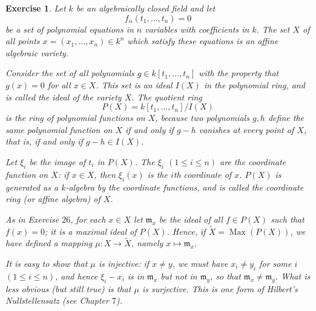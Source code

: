 \documentclass[12pt,letterpaper]{article}
\newtheorem{problem}{Exercise}[section]
\theoremstyle{definition}
\theoremstyle{remark}
\numberwithin{figure}{problem}
\numberwithin{equation}{section}
\DeclareMathOperator{\Max}{Max}
\begin{document}
\begin{problem}
  Let $k$ be an algebraically closed field and let
  \begin{equation*}
    f_\alpha(t_1,\ldots,t_n) = 0
  \end{equation*}
  be a set of polynomial equations in $n$ variables with coefficients in $k$. The set $X$ of all points $x = (x_1,\ldots,x_n) \in k^n$ which satisfy these equations is an \emph{affine algebraic variety}.
  \par Consider the set of all polynomials $g \in k[t_1,\ldots,t_n]$ with the property that $g(x) = 0$ for all $x \in X$. This set is an ideal $I(X)$ in the polynomial ring, and is called the \emph{ideal of the variety $X$}. The quotient ring
  \begin{equation*}
    P(X) = k[t_1,\ldots,t_n]/I(X)
  \end{equation*}
  is the ring of polynomial functions on $X$, because two polynomials $g,h$ define the same polynomial function on $X$ if and only if $g - h$ vanishes at every point of $X$, that is, if and only if $g - h \in I(X)$.
  \par Let $\xi_i$ be the image of $t_i$ in $P(X)$. The $\xi_i$ $(1 \le i \le n)$ are the \emph{coordinate function} on $X$: if $x \in X$, then $\xi_i(x)$ is the $i$th coordinate of $x$. $P(X)$ is generated as a $k$-algebra by the coordinate functions, and is called the \emph{coordinate ring} (or affine algebra) of $X$.
  \par As in Exercise \hyperref[exc:1.26]{$26$}, for each $x \in X$ let $\mathfrak{m}_x$ be the ideal of all $f \in P(X)$ such that $f(x) = 0$; it is a maximal ideal of $P(X)$. Hence, if $\tilde{X} = \Max(P(X))$, we have defined a mapping $\mu \colon X \to \tilde{X}$, namely $x \mapsto \mathfrak{m}_x$.
  \par It is easy to show that $\mu$ is injective: if $x \ne y$, we must have $x_i \ne y_i$ for some $i$ $(1 \le i \le n)$, and hence $\xi_i - x_i$ is in $\mathfrak{m}_x$ but not in $\mathfrak{m}_y$, so that $\mathfrak{m}_x \ne \mathfrak{m}_y$. What is less obvious (but still true) is that $\mu$ is \emph{surjective}. This is one form of Hilbert's Nullstellensatz (see Chapter \href{AM 7 Noetherian Rings.pdf}{$7$}).
\end{problem}
\end{document}
